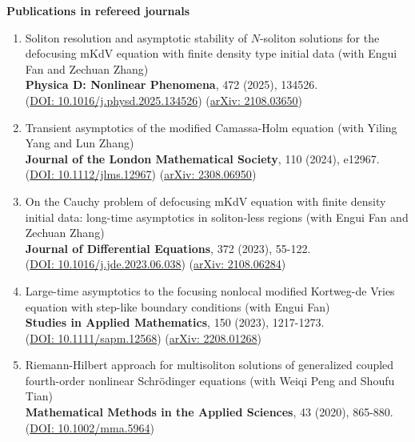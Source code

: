 \documentclass[letterpaper,11pt,UTF8]{ctexart}
\begin{document}
\large\textbf{Publications in refereed journals}
\begin{flushleft}
    \begin{enumerate}[1.]
    \item Soliton resolution and asymptotic stability of $N$-soliton solutions for the defocusing mKdV equation with finite density type initial data (with Engui Fan and Zechuan Zhang)\\ 
    {\bf Physica D: Nonlinear Phenomena}, 472 (2025), 134526. \\
    (\href{https://doi.org/10.1016/j.physd.2025.134526}{DOI: 10.1016/j.physd.2025.134526}) (\href{https://arxiv.org/abs/2108.03650}{arXiv: 2108.03650})

    \item Transient asymptotics of the modified Camassa-Holm equation (with Yiling Yang and Lun Zhang) \\
    {\bf Journal of the London Mathematical Society}, 110 (2024), e12967. \\
    (\href{https://londmathsoc.onlinelibrary.wiley.com/doi/10.1112/jlms.12967}{DOI: 10.1112/jlms.12967}) (\href{https://arxiv.org/abs/2308.06950}{arXiv: 2308.06950})

    \item On the Cauchy problem of defocusing mKdV equation with finite density initial data: long-time asymptotics in soliton-less regions (with Engui Fan and Zechuan Zhang)\\
    {\bf Journal of Differential Equations}, 372 (2023), 55-122.\\
    (\href{https://www.sciencedirect.com/science/article/pii/S002203962300445X?via%3Dihub}{DOI: 10.1016/j.jde.2023.06.038}) (\href{https://arxiv.org/abs/2108.06284}{arXiv: 2108.06284})

    \item Large-time asymptotics to the focusing nonlocal modified Kortweg-de Vries equation with step-like boundary conditions (with Engui Fan)\\
    {\bf Studies in Applied Mathematics}, 150 (2023), 1217-1273. \\
    (\href{https://onlinelibrary.wiley.com/doi/10.1111/sapm.12568}{DOI: 10.1111/sapm.12568}) (\href{https://arxiv.org/abs/2208.01268}{arXiv: 2208.01268})

    \item Riemann-Hilbert approach for multisoliton solutions of generalized coupled fourth-order nonlinear Schr\"odinger equations
    (with Weiqi Peng and Shoufu Tian)\\
    {\bf Mathematical Methods in the Applied Sciences}, 43 (2020), 865-880.\\
    (\href{https://onlinelibrary.wiley.com/doi/10.1002/mma.5964}{DOI: 10.1002/mma.5964})
    \end{enumerate}
\end{flushleft}
\vspace{3mm}
\end{document}
